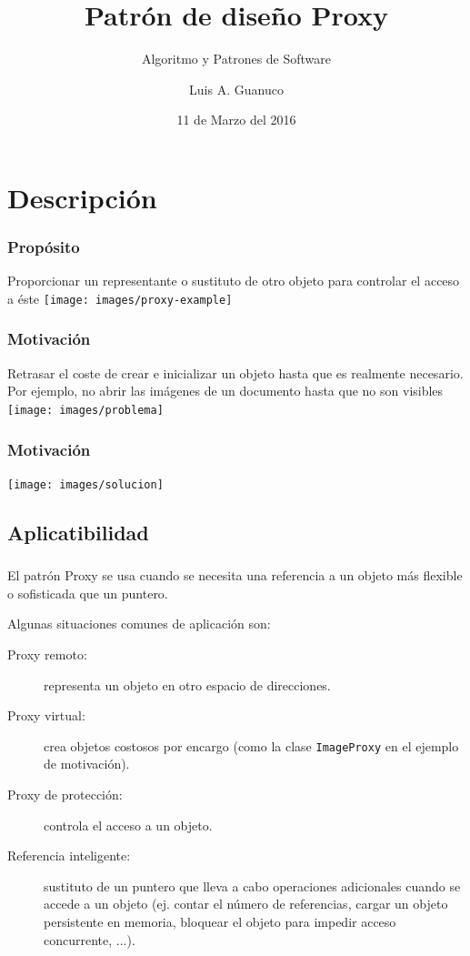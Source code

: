 \documentclass{beamer}
\title[Proxy]{Patrón de diseño Proxy}
\author{Luis A. Guanuco}
\institute[ESE -- IUA]{Especialización en Sistemabas Embebidos \\ Instituto Universitario Aeronáutico}
\date{11 de Marzo del 2016}
\subtitle{Algoritmo y Patrones de Software}
\begin{document}

\begin{frame}
  \titlepage
\end{frame}

\section[Descripción]{Descripción}

\begin{frame}{\insertsection{}}
  \frametitle{Propósito}
    Proporcionar un representante o sustituto de otro objeto
    para controlar el acceso a éste
    \vfill
    \centering
    \texttt{[image: images/proxy-example]}
\end{frame}

\begin{frame}{\insertsection{}}
  \frametitle{Motivación}
  Retrasar el coste de crear e inicializar un objeto hasta
  que es realmente necesario. Por ejemplo, no abrir las
  imágenes de un documento hasta que no son visibles
  \vfill
  \centering
  \texttt{[image: images/problema]}
\end{frame}

\begin{frame}{\insertsection{}}
  \frametitle{Motivación}
  \texttt{[image: images/solucion]}  
\end{frame}

\subsection[Aplicatibilidad]{Aplicatibilidad}

\begin{frame}{\insertsubsection{}}
  \frametitle{\insertsubsection{}}
  El patrón Proxy se usa cuando se necesita una referencia
  a un objeto más flexible o sofisticada que un puntero.

  Algunas situaciones comunes de aplicación son:
  \begin{description}
  \item[Proxy remoto:] representa un objeto en otro espacio de
    direcciones.
  \item[Proxy virtual:] crea objetos costosos por encargo (como la clase
    \texttt{ImageProxy} en el ejemplo de motivación).
    \item[Proxy de protección:] controla el acceso a un objeto.
    \item[Referencia inteligente:] sustituto de un puntero que lleva a
      cabo operaciones adicionales cuando se accede a un objeto
      (ej. contar el número de referencias, cargar un objeto
      persistente en memoria, bloquear el objeto para impedir acceso
      concurrente, ...).
  \end{description}
\end{frame}
\end{document}
